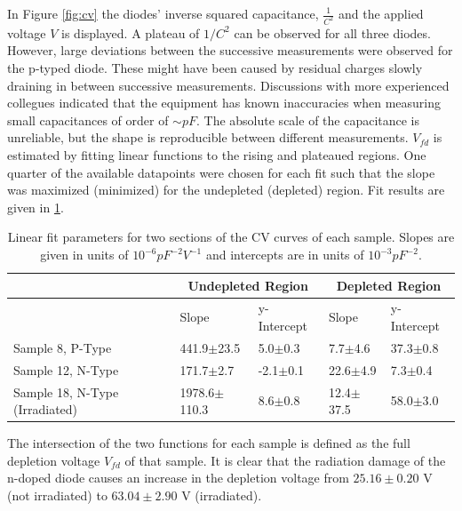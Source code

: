 \documentclass[11pt,a4paper]{report}
\begin{document}
In Figure \ref{fig:cv} the diodes' inverse squared capacitance, $\frac{1}{C^{2}}$ and the applied voltage $V$ is displayed.
A plateau of $1/C^2$ can be observed for all three diodes.
However, large deviations between the successive measurements were observed for the p-typed diode. These might have been caused by residual charges slowly draining in between successive measurements.
Discussions with more experienced collegues indicated that the equipment has known inaccuracies when measuring small capacitances of order of $\sim pF$. The absolute scale of the capacitance is unreliable, but the shape is reproducible between different measurements.
$V_{fd}$ is estimated by fitting linear functions to the rising and plateaued regions. One quarter of the available datapoints were chosen for each fit such that the slope was maximized (minimized) for the undepleted (depleted) region. Fit results are given in \ref{tab:fits}.

\begin{table}[]
\centering
\caption{Linear fit parameters for two sections of the CV curves of each sample. Slopes are given in units of $10^{-6}pF^{-2}V^{-1}$ and intercepts are in units of $10^{-3}pF^{-2}$.}\label{tab:fits}
\begin{tabular}{lllll}
    \toprule
    & \multicolumn{2}{c}{Undepleted Region}   & \multicolumn{2}{c}{Depleted Region}  \\
    \midrule
    & Slope & y-Intercept & Slope & y-Intercept \\
    \midrule
    Sample 8, P-Type                & 441.9$\pm$23.5    & 5.0$\pm$0.3     & 7.7$\pm$4.6     & 37.3$\pm$0.8  \\
    Sample 12, N-Type               & 171.7$\pm$2.7     & -2.1$\pm$0.1    & 22.6$\pm$4.9    & 7.3$\pm$0.4   \\
    Sample 18, N-Type (Irradiated)  & 1978.6$\pm$110.3   & 8.6$\pm$0.8  & 12.4$\pm$37.5   & 58.0$\pm$3.0    \\
    \bottomrule
\end{tabular}
\end{table}

The intersection of the two functions for each sample is defined as the full depletion voltage $V_{fd}$ of that sample.
It is clear that the radiation damage of the n-doped diode causes an increase in the depletion voltage from $25.16\pm0.20$ V (not irradiated) to $63.04\pm2.90$ V (irradiated).
\end{document}
